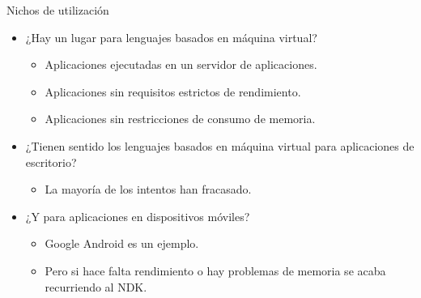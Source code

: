 \begin{frame}[t]{Nichos de utilización}
  \begin{itemize}
    \item ¿Hay un lugar para lenguajes basados en máquina virtual?
      \begin{itemize}
        \item Aplicaciones ejecutadas en un servidor de aplicaciones.
        \item Aplicaciones sin requisitos estrictos de rendimiento.
        \item Aplicaciones sin restricciones de consumo de memoria.
      \end{itemize}
    \item \pause ¿Tienen sentido los lenguajes basados en máquina virtual para aplicaciones de escritorio?
      \begin{itemize}
        \item La mayoría de los intentos han fracasado.
      \end{itemize}
    \item \pause ¿Y para aplicaciones en dispositivos móviles?
      \begin{itemize}
        \item Google Android es un ejemplo.
        \item Pero si hace falta rendimiento o hay problemas de memoria se acaba recurriendo al NDK.
      \end{itemize}
  \end{itemize}
\end{frame}
